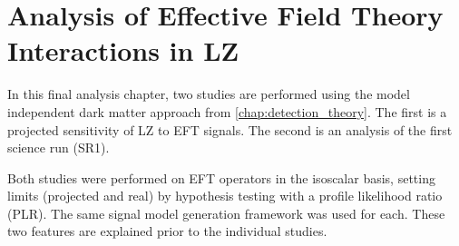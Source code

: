 \chapter{Analysis of Effective Field Theory Interactions in LZ}
\label{chap:analysis_eft_work}
In this final analysis chapter, two studies are performed using the model independent dark matter approach from \autoref{chap:detection_theory}.
The first is a projected sensitivity of LZ to EFT signals.
The second is an analysis of the first science run (SR1).
\par
Both studies were performed on EFT operators in the isoscalar basis, setting limits (projected and real) by hypothesis testing with a profile likelihood ratio (PLR).
The same signal model generation framework was used for each.
These two features are explained prior to the individual studies.



%









%

%

